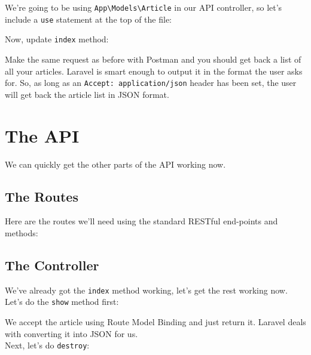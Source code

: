 We're going to be using \texttt{App\textbackslash{}Models\textbackslash{}Article} in our API controller, so let's include a \texttt{use} statement at the top of the file:


Now, update \texttt{index} method:



Make the same request as before with Postman and you should get back a list of all your articles. Laravel is smart enough to output it in the format the user asks for. So, as long as an \texttt{Accept: application/json} header has been set, the user will get back the article list in JSON format.


\section{The API}

We can quickly get the other parts of the API working now.

\subsection{The Routes}

Here are the routes we'll need using the standard RESTful end-points and methods:


\subsection{The Controller}

We've already got the \texttt{index} method working, let's get the rest working now.
\\

Let's do the \texttt{show} method first:


We accept the article using Route Model Binding and just return it. Laravel deals with converting it into JSON for us.
\\

Next, let's do \texttt{destroy}:


